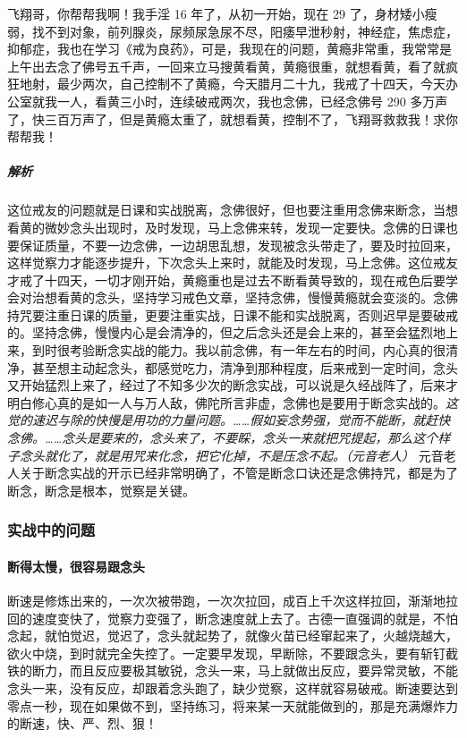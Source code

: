 \begin{case}[练习过程中的问题]
    飞翔哥，你帮帮我啊！我手淫 16 年了，从初一开始，现在 29 了，身材矮小瘦弱，找不到对象，前列腺炎，尿频尿急尿不尽，阳痿早泄秒射，神经症，焦虑症，抑郁症，我也在学习《戒为良药》，可是，我现在的问题，黄瘾非常重，我常常是上午出去念了佛号五千声，一回来立马搜黄看黄，黄瘾很重，就想看黄，看了就疯狂地射，最少两次，自己控制不了黄瘾，今天腊月二十九，我戒了十四天，今天办公室就我一人，看黄三小时，连续破戒两次，我也念佛，已经念佛号 290 多万声了，快三百万声了，但是黄瘾太重了，就想看黄，控制不了，飞翔哥救救我！求你帮帮我！
    \subparagraph{解析} 这位戒友的问题就是日课和实战脱离，念佛很好，但也要注重用念佛来断念，当想看黄的微妙念头出现时，及时发现，马上念佛来转，发现一定要快。念佛的日课也要保证质量，不要一边念佛，一边胡思乱想，发现被念头带走了，要及时拉回来，这样觉察力才能逐步提升，下次念头上来时，就能及时发现，马上念佛。这位戒友才戒了十四天，一切才刚开始，黄瘾重也是过去不断看黄导致的，现在戒色后要学会对治想看黄的念头，坚持学习戒色文章，坚持念佛，慢慢黄瘾就会变淡的。念佛持咒要注重日课的质量，更要注重实战，日课不能和实战脱离，否则迟早是要破戒的。坚持念佛，慢慢内心是会清净的，但之后念头还是会上来的，甚至会猛烈地上来，到时很考验断念实战的能力。我以前念佛，有一年左右的时间，内心真的很清净，甚至想主动起念头，都感觉吃力，清净到那种程度，后来戒到一定时间，念头又开始猛烈上来了，经过了不知多少次的断念实战，可以说是久经战阵了，后来才明白修心真的是如一人与万人敌，佛陀所言非虚，念佛也是要用于断念实战的。\textit{这觉的速迟与除的快慢是用功的力量问题。……假如妄念势强，觉而不能断，就赶快念佛。……念头是要来的，念头来了，不要睬，念头一来就把咒提起，那么这个样子念头就化了，就是用咒来化念，把它化掉，不是压念不起。（元音老人）} 元音老人关于断念实战的开示已经非常明确了，不管是断念口诀还是念佛持咒，都是为了断念，断念是根本，觉察是关键。
\end{case}

\subsubsection{实战中的问题}

\paragraph{断得太慢，很容易跟念头}

断速是修炼出来的，一次次被带跑，一次次拉回，成百上千次这样拉回，渐渐地拉回的速度变快了，觉察力变强了，断念速度就上去了。古德一直强调的就是，不怕念起，就怕觉迟，觉迟了，念头就起势了，就像火苗已经窜起来了，火越烧越大，欲火中烧，到时就完全失控了。一定要早发现，早断除，不要跟念头，要有斩钉截铁的断力，而且反应要极其敏锐，念头一来，马上就做出反应，要异常灵敏，不能念头一来，没有反应，却跟着念头跑了，缺少觉察，这样就容易破戒。断速要达到零点一秒，现在如果做不到，坚持练习，将来某一天就能做到的，那是充满爆炸力的断速，快、严、烈、狠！

